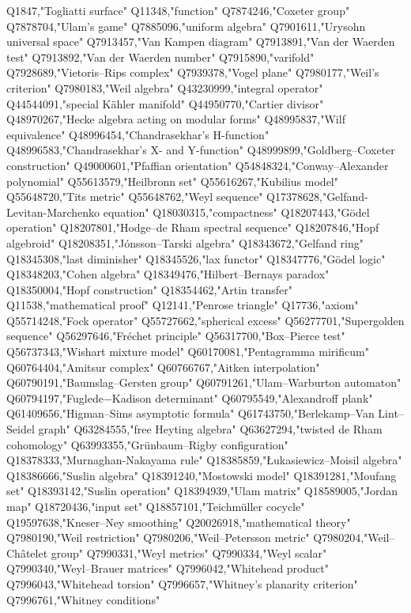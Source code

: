 Q1847,"Togliatti surface"
Q11348,"function"
Q7874246,"Coxeter group"
Q7878704,"Ulam's game"
Q7885096,"uniform algebra"
Q7901611,"Urysohn universal space"
Q7913457,"Van Kampen diagram"
Q7913891,"Van der Waerden test"
Q7913892,"Van der Waerden number"
Q7915890,"varifold"
Q7928689,"Vietoris–Rips complex"
Q7939378,"Vogel plane"
Q7980177,"Weil's criterion"
Q7980183,"Weil algebra"
Q43230999,"integral operator"
Q44544091,"special Kähler manifold"
Q44950770,"Cartier divisor"
Q48970267,"Hecke algebra acting on modular forms"
Q48995837,"Wilf equivalence"
Q48996454,"Chandrasekhar's H-function"
Q48996583,"Chandrasekhar's X- and Y-function"
Q48999899,"Goldberg–Coxeter construction"
Q49000601,"Pfaffian orientation"
Q54848324,"Conway–Alexander polynomial"
Q55613579,"Heilbronn set"
Q55616267,"Kubilius model"
Q55648720,"Tits metric"
Q55648762,"Weyl sequence"
Q17378628,"Gelfand-Levitan-Marchenko equation"
Q18030315,"compactness"
Q18207443,"Gödel operation"
Q18207801,"Hodge–de Rham spectral sequence"
Q18207846,"Hopf algebroid"
Q18208351,"Jónsson–Tarski algebra"
Q18343672,"Gelfand ring"
Q18345308,"last diminisher"
Q18345526,"lax functor"
Q18347776,"Gödel logic"
Q18348203,"Cohen algebra"
Q18349476,"Hilbert–Bernays paradox"
Q18350004,"Hopf construction"
Q18354462,"Artin transfer"
Q11538,"mathematical proof"
Q12141,"Penrose triangle"
Q17736,"axiom"
Q55714248,"Fock operator"
Q55727662,"spherical excess"
Q56277701,"Supergolden sequence"
Q56297646,"Fréchet principle"
Q56317700,"Box–Pierce test"
Q56737343,"Wishart mixture model"
Q60170081,"Pentagramma mirificum"
Q60764404,"Amitsur complex"
Q60766767,"Aitken interpolation"
Q60790191,"Baumslag–Gersten group"
Q60791261,"Ulam–Warburton automaton"
Q60794197,"Fuglede−Kadison determinant"
Q60795549,"Alexandroff plank"
Q61409656,"Higman–Sims asymptotic formula"
Q61743750,"Berlekamp–Van Lint–Seidel graph"
Q63284555,"free Heyting algebra"
Q63627294,"twisted de Rham cohomology"
Q63993355,"Grünbaum–Rigby configuration"
Q18378333,"Murnaghan-Nakayama rule"
Q18385859,"Łukasiewicz–Moisil algebra"
Q18386666,"Suslin algebra"
Q18391240,"Mostowski model"
Q18391281,"Moufang set"
Q18393142,"Suslin operation"
Q18394939,"Ulam matrix"
Q18589005,"Jordan map"
Q18720436,"input set"
Q18857101,"Teichmüller cocycle"
Q19597638,"Kneser–Ney smoothing"
Q20026918,"mathematical theory"
Q7980190,"Weil restriction"
Q7980206,"Weil–Petersson metric"
Q7980204,"Weil–Châtelet group"
Q7990331,"Weyl metrics"
Q7990334,"Weyl scalar"
Q7990340,"Weyl–Brauer matrices"
Q7996042,"Whitehead product"
Q7996043,"Whitehead torsion"
Q7996657,"Whitney's planarity criterion"
Q7996761,"Whitney conditions"
